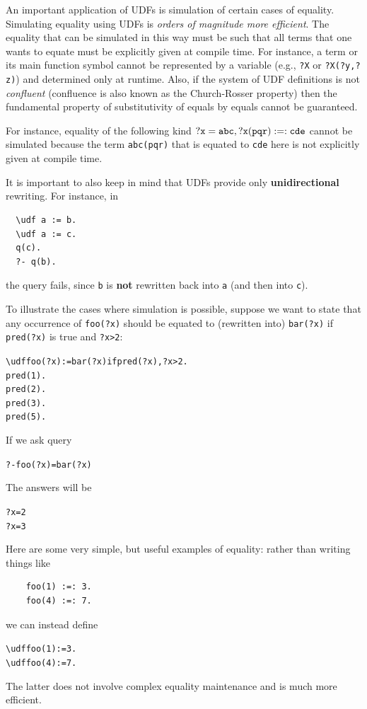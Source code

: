 \documentclass[11pt]{article}
\newcommand{\bs}{\textbackslash}
\begin{document}
An important application of UDFs is simulation of certain cases of
equality.
Simulating equality using UDFs is \emph{orders of magnitude more
  efficient}.  
The equality that can be simulated in this way must be such
that all terms that one wants to equate must be explicitly given at
compile time. For instance, a term or its main function symbol cannot be
represented by a variable (e.g., \texttt{?X} or \texttt{?X(?y,?z)})  and
determined only at runtime.
Also, if the system of UDF definitions is not \emph{confluent} 
(confluence is also known as the Church-Rosser property) then
the fundamental property of
substitutivity of equals by equals cannot be guaranteed.


For instance, equality of the following kind $\tt ?x=abc, ?x(pqr) :=: cde$
cannot be simulated because the term \texttt{abc(pqr)} that is equated to
\texttt{cde} here is not explicitly given at compile time.  

It is important to also keep in mind that UDFs provide only \textbf{unidirectional}
rewriting. For instance, in
\begin{verbatim}
  \udf a := b.
  \udf a := c.
  q(c).
  ?- q(b).
\end{verbatim}
the query fails, since \texttt{b} is \textbf{not} rewritten back into \texttt{a}
(and then into \texttt{c}).   

To illustrate the cases where simulation is possible, suppose we want to
state that any occurrence of \texttt{foo(?x)} should be equated to (rewritten
into) \texttt{bar(?x)} if \texttt{pred(?x)} is true and \texttt{?x>2}: 
\begin{alltt}
    \bs{}udf foo(?x):=bar(?x) if  pred(?x), ?x>2.
    pred(1).
    pred(2).
    pred(3).
    pred(5).
\end{alltt}

If we ask query
\begin{alltt}
    ?- foo(?x)=bar(?x)
\end{alltt}
The answers will be
\begin{alltt}
    ?x=2
    ?x=3
\end{alltt}


Here are some very simple, but useful examples of equality: rather than
writing things like
\begin{verbatim}
    foo(1) :=: 3.
    foo(4) :=: 7.
\end{verbatim}
we can instead define
\begin{alltt}
    \bs{}udf foo(1):=3.
    \bs{}udf foo(4):=7.
\end{alltt}
The latter does not involve complex equality maintenance and is much more
efficient.
\end{document}
